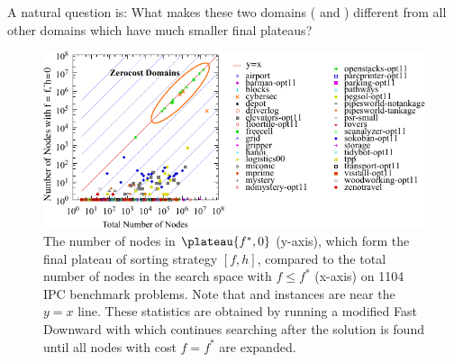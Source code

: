 A natural question is:  What makes these two domains
( and )  different from all other domains
which have much smaller final plateaus?

\begin{figure}[htbp]
   \centering
  \includegraphics[width=\linewidth]{tables/aaai16-frontier/aaai16prelim3/lmcut_frontier-front.pdf}
  \caption{
 The number of nodes in $\plateau{f^*, 0}$ (y-axis), which form
  the final plateau of sorting strategy $[f,h]$, compared to
  the total number of nodes in the search space with $f\leq f^*$
 (x-axis) on 1104 IPC benchmark problems.  Note that 
  and  instances are near the $y=x$ line.
  These statistics are obtained by running a modified Fast Downward with
 \lmcut which continues searching after the solution is found
 until all nodes with cost $f=f^*$ are expanded.} \label{fig:plateau}
\end{figure}

